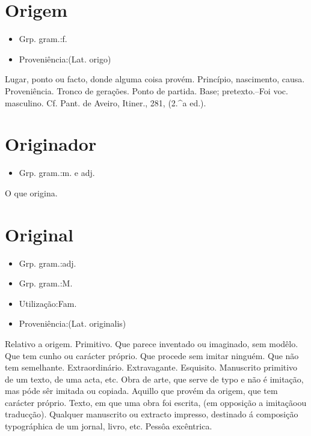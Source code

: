 \section{Origem}
\begin{itemize}
\item {Grp. gram.:f.}
\end{itemize}
\begin{itemize}
\item {Proveniência:(Lat. \textunderscore origo\textunderscore )}
\end{itemize}
Lugar, ponto ou facto, donde alguma coisa provém.
Princípio, nascimento, causa.
Proveniência.
Tronco de gerações.
Ponto de partida.
Base; pretexto.--Foi voc. masculino. Cf. Pant. de Aveiro, \textunderscore Itiner.\textunderscore , 281, (2.^a ed.).
\section{Originador}
\begin{itemize}
\item {Grp. gram.:m.  e  adj.}
\end{itemize}
O que origina.
\section{Original}
\begin{itemize}
\item {Grp. gram.:adj.}
\end{itemize}
\begin{itemize}
\item {Grp. gram.:M.}
\end{itemize}
\begin{itemize}
\item {Utilização:Fam.}
\end{itemize}
\begin{itemize}
\item {Proveniência:(Lat. \textunderscore originalis\textunderscore )}
\end{itemize}
Relativo a origem.
Primitivo.
Que parece inventado ou imaginado, sem modêlo.
Que tem cunho ou carácter próprio.
Que procede sem imitar ninguém.
Que não tem semelhante.
Extraordinário.
Extravagante.
Esquisito.
Manuscrito primitivo de um texto, de uma acta, etc.
Obra de arte, que serve de typo e não é imitação, mas póde sêr imitada ou copiada.
Aquillo que provém da origem, que tem carácter próprio.
Texto, em que uma obra foi escrita, (em opposição a \textunderscore imitação\textunderscore  ou \textunderscore traducção\textunderscore ).
Qualquer manuscrito ou extracto impresso, destinado á composição typográphica de um jornal, livro, etc.
Pessôa excêntrica.
